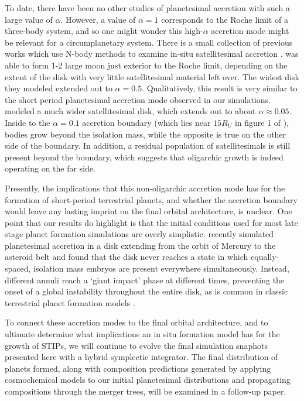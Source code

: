 \documentclass[twocolumn]{aastex63}
\begin{document}
To date, there have been no other studies of planetesimal accretion with such a large value of $\alpha$. However, a value of $\alpha = 1$ corresponds to the Roche limit of a three-body system, and so one might wonder this high-$\alpha$ accretion mode might be relevant for a circumplanetary system. There is a small collection of previous works which use N-body methods to examine in-situ satellitesimal accretion \citep{ida97, richardson00, ida20}. \citet{ida97} was able to form 1-2 large moon just exterior to the Roche limit, depending on the extent of the disk with very little satellitesimal material left over. The widest disk they modeled extended out to $\alpha = 0.5$. Qualitatively, this result is very similar to the short period planetesimal accretion mode observed in our simulations. \citet{ida20} modeled a much wider satellitesimal disk, which extends out to about $\alpha \approx 0.05$. Inside to the $\alpha = 0.1$ accretion boundary (which lies near $15 R_{U}$ in figure 1 of \citet{ida20}), bodies grow beyond the isolation mass, while the opposite is true on the other side of the boundary. In addition, a residual population of satellitesimals is still present beyond the boundary, which suggests that oligarchic growth is indeed operating on the far side.

Presently, the implications that this non-oligarchic accretion mode has for the formation of short-period terrestrial planets, and whether the accretion boundary would leave any lasting imprint on the final orbital architecture, is unclear. One point that our results do highlight is that the initial conditions used for most late stage planet formation simulations are overly simplistic. \citet{clement20} recently simulated planetesimal accretion in a disk extending from the orbit of Mercury to the asteroid belt and found that the disk never reaches a state in which equally-spaced, isolation mass embryos are present everywhere simultaneously. Instead, different annuli reach a `giant impact' phase at different times, preventing the onset of a global instability throughout the entire disk, as is common in classic terrestrial planet formation models \citep{chambers01, raymond09}.


To connect these accretion modes to the final orbital architecture, and to ultimate determine what implications an in situ formation model has for the growth of STIPs, we will continue to evolve the final simulation snaphots presented here with a hybrid symplectic integrator. The final distribution of planets formed, along with composition predictions generated by applying cosmochemical models to our initial planetesimal distributions and propagating compositions through the merger trees, will be examined in a follow-up paper.



\clearpage
\end{document}
